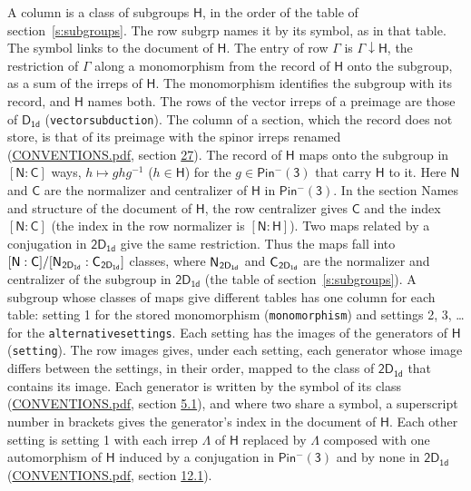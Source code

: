 \documentclass[10pt,a4paper]{article}
\numberwithin{equation}{section}
\newcommand{\grp}[1]{\mathsf{#1}}
\newcommand{\grpindex}[2]{[#1 : #2]}
\newcommand{\restr}[2]{#1\!\downarrow#2}
\newcommand{\hairsp}{\mkern1mu}
\begin{document}
A column is a class of subgroups $\grp{H}$, in the order of the table of section~\ref{s:subgroups}. The row subgrp names it by its symbol, as in that table. The symbol links to the document of $\grp{H}$. The entry of row $\Gamma$ is $\restr{\Gamma}{\grp{H}}$, the restriction of $\Gamma$ along a monomorphism from the record of $\grp{H}$ onto the subgroup, as a sum of the irreps of $\grp{H}$. The monomorphism identifies the subgroup with its record, and $\grp{H}$ names both. The rows of the vector irreps of a preimage are those of \href{../../../rotation/data/pdf/D1d.pdf}{$\grp{D_{1d}}$} (\texttt{vectorsubduction}). The column of a section, which the record does not store, is that of its preimage with the spinor irreps renamed (\href{../../CONVENTIONS.pdf}{CONVENTIONS.pdf}, section \href{../../CONVENTIONS.pdf\#conv.27}{27}). \label{n:group.normalizer.o3}\label{n:group.centralizer.o3}\label{n:element.h}The record of $\grp{H}$ maps onto the subgroup in $\grpindex{\grp{N}}{\grp{C}}$ ways, $h \mapsto g h g^{-1}$ ($h \in \grp{H}$) for the $g \in \grp{Pin^{-}(3)}$ that carry $\grp{H}$ to it. Here $\grp{N}$ and $\grp{C}$ are the normalizer and centralizer of $\grp{H}$ in \href{Pinminus3.pdf}{$\grp{Pin^{-}(3)}$}. In the section Names and structure of the document of $\grp{H}$, the row centralizer gives $\grp{C}$ and the index $\grpindex{\grp{N}}{\grp{C}}$ (the index in the row normalizer is $\grpindex{\grp{N}}{\grp{H}}$). Two maps related by a conjugation in $\grp{2D_{1d}}$ give the same restriction. Thus the maps fall into $\grpindex{\grp{N}}{\grp{C}}/\grpindex{\grp{N}_{\hairsp \grp{2D_{1d}}}}{\grp{C}_{\hairsp \grp{2D_{1d}}}}$ classes, where $\grp{N}_{\hairsp \grp{2D_{1d}}}$ and $\grp{C}_{\hairsp \grp{2D_{1d}}}$ are the normalizer and centralizer of the subgroup in $\grp{2D_{1d}}$ (the table of section~\ref{s:subgroups}). \label{n:head.setting}A subgroup whose classes of maps give different tables has one column for each table: setting 1 for the stored monomorphism (\texttt{monomorphism}) and settings 2, 3, \dots{} for the \texttt{alternativesettings}. Each setting has the images of the generators of $\grp{H}$ (\texttt{setting}). \label{n:head.images}The row images gives, under each setting, each generator whose image differs between the settings, in their order, mapped to the class of $\grp{2D_{1d}}$ that contains its image. Each generator is written by the symbol of its class (\href{../../CONVENTIONS.pdf}{CONVENTIONS.pdf}, section \href{../../../rotation/CONVENTIONS.pdf\#conv.5.1}{5.1}), and where two share a symbol, a superscript number in brackets gives the generator's index in the document of $\grp{H}$. \label{n:irrep.Delta}Each other setting is setting 1 with each irrep $\Lambda$ of $\grp{H}$ replaced by $\Lambda$ composed with one automorphism of $\grp{H}$ induced by a conjugation in \href{Pinminus3.pdf}{$\grp{Pin^{-}(3)}$} and by none in $\grp{2D_{1d}}$ (\href{../../CONVENTIONS.pdf}{CONVENTIONS.pdf}, section \href{../../../rotation/CONVENTIONS.pdf\#conv.12.1}{12.1}).
\end{document}
